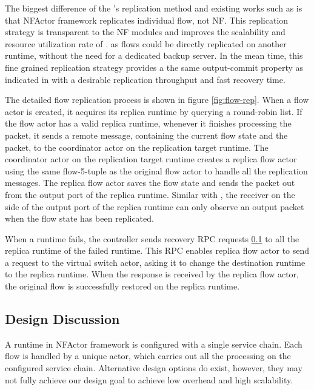 The biggest difference of the \nfactor's replication method and existing works such as \cite{sherry2015rollback} is that NFActor framework replicates individual flow, not NF. This replication strategy is transparent to the NF modules and improves the scalability and resource utilization rate of \nfactor. as flows could be directly replicated on another runtime, without the need for a dedicated backup server. In the mean time, this fine grained replication strategy provides a the same output-commit property as indicated in \cite{sherry2015rollback} with a desirable replication throughput and fast recovery time.

The detailed flow replication process is shown in figure \ref{fig:flow-rep}. When a flow actor is created, it acquires its replica runtime by querying a round-robin list. If the flow actor has a valid replica runtime, whenever it finishes processing the packet, it sends a remote message, containing the current flow state and the packet, to the coordinator actor on the replication target runtime. The coordinator actor on the replication target runtime creates a replica flow actor using the same flow-5-tuple as the original flow actor to handle all the replication messages. The replica flow actor saves the flow state and sends the packet out from the output port of the replica runtime. Similar with \cite{sherry2015rollback}, the receiver on the side of the output port of the replica runtime can only observe an output packet when the flow state has been replicated.

When a runtime fails, the controller sends recovery RPC requests \ref{} to all the replica runtime of the failed runtime. This RPC enables replica flow actor to send a request to the virtual switch actor, asking it to change the destination runtime to the replica runtime. When the response is received by the replica flow actor, the original flow is successfully restored on the replica runtime.

\subsection{Design Discussion}

A runtime in NFActor framework is configured with a single service chain. Each flow is handled by a unique actor, which carries out all the processing on the configured service chain. Alternative design options do exist, however, they may not fully achieve our design goal to achieve low overhead and high scalability.

